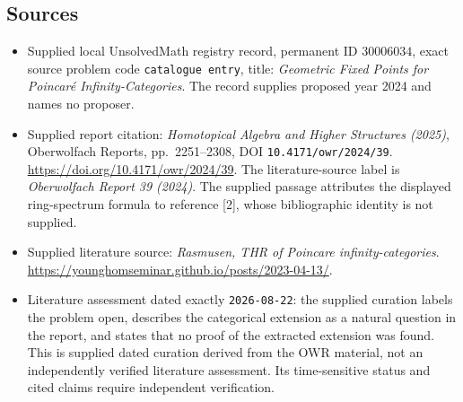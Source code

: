 \documentclass[11pt]{article}
\begin{document}
\subsection{Sources}
\begin{itemize}
\item Supplied local UnsolvedMath registry record, permanent ID \(30006034\), exact source problem code \texttt{catalogue entry}, title: \emph{Geometric Fixed Points for Poincar\'e Infinity-Categories}. The record supplies proposed year 2024 and names no proposer.
\item Supplied report citation: \emph{Homotopical Algebra and Higher Structures (2025)}, Oberwolfach Reports, pp.\ 2251--2308, DOI \texttt{10.4171/owr/2024/39}. \url{https://doi.org/10.4171/owr/2024/39}. The literature-source label is \emph{Oberwolfach Report 39 (2024)}. The supplied passage attributes the displayed ring-spectrum formula to reference [2], whose bibliographic identity is not supplied.
\item Supplied literature source: \emph{Rasmusen, THR of Poincare infinity-categories}. \url{https://younghomseminar.github.io/posts/2023-04-13/}.
\item Literature assessment dated exactly \texttt{2026-08-22}: the supplied curation labels the problem open, describes the categorical extension as a natural question in the report, and states that no proof of the extracted extension was found. This is supplied dated curation derived from the OWR material, not an independently verified literature assessment. Its time-sensitive status and cited claims require independent verification.
\end{itemize}
\end{document}

